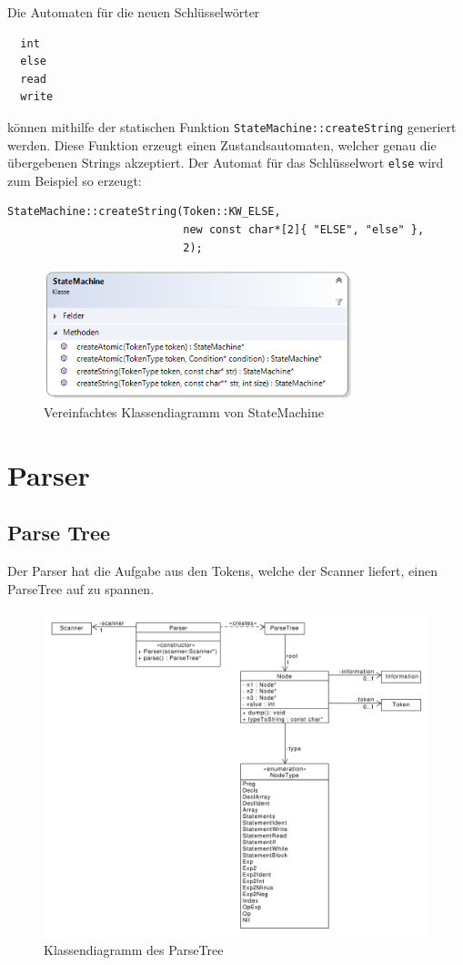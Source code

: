 \documentclass[
a4paper
]{scrreprt}
\begin{document}
Die Automaten für die neuen Schlüsselwörter    
\begin{lstlisting}     
  int
  else
  read
  write
\end{lstlisting}    
können mithilfe der statischen Funktion \lstinline{StateMachine::createString} generiert werden. Diese Funktion erzeugt einen Zustandsautomaten, welcher genau die übergebenen Strings akzeptiert. Der Automat für das Schlüsselwort \lstinline{else} wird zum Beispiel so erzeugt:
\begin{lstlisting}
StateMachine::createString(Token::KW_ELSE, 
                           new const char*[2]{ "ELSE", "else" }, 
                           2);
\end{lstlisting}

\begin{figure}
\centering
\includegraphics[width=0.8\textwidth]{./images/statemachine.png}
\caption{Vereinfachtes Klassendiagramm von StateMachine}
\end{figure}

\chapter{Parser}
\section{Parse Tree}
Der Parser hat die Aufgabe aus den Tokens, welche der Scanner liefert, einen ParseTree auf zu spannen. \\

\begin{figure}[htbp]
\centering
\includegraphics[width=\textwidth]{./diagramms/parser.pdf}
\caption{Klassendiagramm des ParseTree}
\end{figure}
\end{document}
